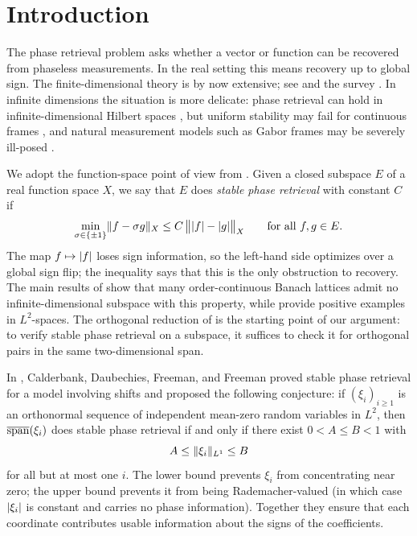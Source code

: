 \section{Introduction}\label{sec:intro}

The phase retrieval problem asks whether a vector or function can be recovered
from phaseless measurements. In the real setting this means recovery up to
global sign. The finite-dimensional theory is by now extensive; see
\cite{bandeira2014saving, eldar2014stability} and the survey
\cite{grohs2020survey}. In infinite dimensions the situation is more
delicate: phase retrieval can hold in infinite-dimensional Hilbert spaces
\cite{cahill2016infinite}, but uniform stability may fail for continuous
frames \cite{alaifari2017continuous}, and natural measurement models such as
Gabor frames may be severely ill-posed \cite{alaifari2021gabor}.

We adopt the function-space point of view from \cite{FOTP}. Given a closed
subspace $E$ of a real function space $X$, we say that $E$ does \emph{stable
phase retrieval} with constant $C$ if
\[
\min_{\sigma \in \{\pm 1\}} \lVert f - \sigma g \rVert_X
\le C \, \bigl\| \lvert f \rvert - \lvert g \rvert \bigr\|_X
\qquad
\text{for all } f, g \in E.
\]
The map $f \mapsto \lvert f \rvert$ loses sign information, so the left-hand side
optimizes over a global sign flip; the inequality says that this is the only
obstruction to recovery. The main results of \cite{FOTP} show that many
order-continuous Banach lattices admit no infinite-dimensional subspace with
this property, while \cite{christ2022examples, FOTP} provide positive
examples in $L^2$-spaces. The orthogonal reduction of \cite{FOTP} is the
starting point of our argument: to verify stable phase retrieval on a
subspace, it suffices to check it for orthogonal pairs in the same
two-dimensional span.

In \cite{calderbank2022stable}, Calderbank, Daubechies, Freeman, and Freeman
proved stable phase retrieval for a model involving shifts and proposed the
following conjecture: if $(\xi_i)_{i \ge 1}$ is an orthonormal sequence of
independent mean-zero random variables in $L^2$, then
$\overline{\operatorname{span}}(\xi_i)$ does stable phase retrieval if and only if there
exist $0 < A \le B < 1$ with
\[
A \le \lVert \xi_i \rVert_{L^1} \le B
\]
for all but at most one $i$. The lower bound prevents $\xi_i$ from
concentrating near zero; the upper bound prevents it from being
Rademacher-valued (in which case $\lvert \xi_i \rvert$ is constant and carries no
phase information). Together they ensure that each coordinate contributes
usable information about the signs of the coefficients.

